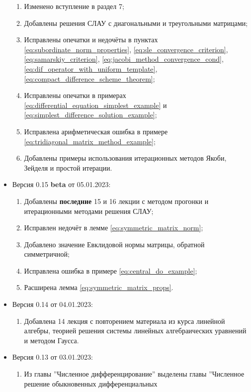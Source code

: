 \documentclass{article}
\begin{document}
\begin{itemize}[nosep]
	\begin{enumerate}[nosep]
		\item Изменено вступление в раздел 7;
		\item Добавлены решения СЛАУ с диагональными и треугольными
			матрицами;
		\item Исправлены опечатки и недочёты в пунктах
			\eqref{eq:subordinate_norm_properties},
			\eqref{eq:sle_convergence_criterion},
			\eqref{eq:samarskiy_criterion},
			\eqref{eq:jacobi_method_convergence_cond},
			\eqref{eq:dif_operator_with_uniform_template},
			\eqref{eq:compact_difference_scheme_theorem};
		\item Исправлены опечатки в примерах
			\eqref{eq:differential_equation_simplest_example} и
			\eqref{eq:simplest_difference_solution_example};
		\item Исправлена арифметическая ошибка в примере
			\eqref{eq:tridiagonal_matrix_method_example};
		\item Добавлены примеры использования итерационных методов
			Якоби, Зейделя и простой итерации.
	\end{enumerate}
\item Версия 0.15 \textbf{beta} от 05.01.2023:
	\begin{enumerate}[nosep]
		\item Добавлены \textbf{последние} 15 и 16 лекции с методом
			прогонки и итерационными методами решения СЛАУ;
		\item Исправлен недочёт в лемме
			\eqref{eq:symmetric_matrix_norm};
		\item Добавлено значение Евклидовой нормы матрицы, обратной
			симметричной;
		\item Исправлена ошибка в примере \eqref{eq:central_do_example};
		\item Расширена лемма \eqref{eq:symmetric_matrix_props}.
	\end{enumerate}
\item Версия 0.14 от 04.01.2023:
	\begin{enumerate}[nosep]
		\item Добавлена 14 лекция с повторением материала из курса
			линейной алгебры, теорией решения системы линейных
			алгебраических уравнений и методом Гаусса.
	\end{enumerate}
\item Версия 0.13 от 03.01.2023:
	\begin{enumerate}[nosep]
		\item Из главы ''Численное дифференцирование'' выделены главы
			''Численное решение обыкновенных дифференциальных

\end{enumerate}
\end{itemize}
\end{document}
